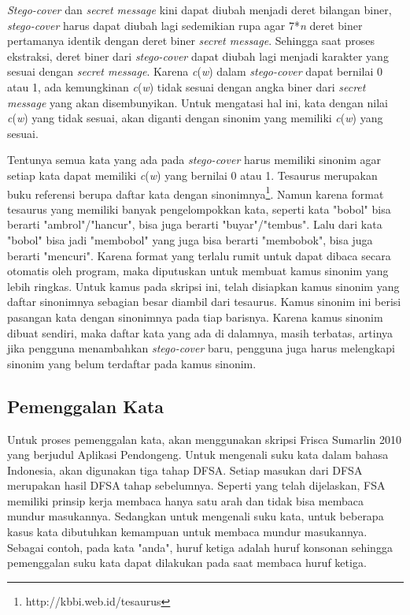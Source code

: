 \textit{Stego-cover} dan \textit{secret message} kini dapat diubah menjadi deret bilangan biner, \textit{stego-cover} harus dapat diubah lagi sedemikian rupa agar 7*\textit{n} deret biner pertamanya identik dengan deret biner \textit{secret message}. Sehingga saat proses ekstraksi, deret biner dari \textit{stego-cover} dapat diubah lagi menjadi karakter yang sesuai dengan \textit{secret message}. Karena \textit{c}(\textit{w}) dalam \textit{stego-cover} dapat bernilai 0 atau 1, ada kemungkinan \textit{c}(\textit{w}) tidak sesuai dengan angka biner dari \textit{secret message} yang akan disembunyikan. Untuk mengatasi hal ini, kata dengan nilai \textit{c}(\textit{w}) yang tidak sesuai, akan diganti dengan sinonim yang memiliki \textit{c}(\textit{w}) yang sesuai.

Tentunya semua kata yang ada pada \textit{stego-cover} harus memiliki sinonim agar setiap kata dapat memiliki \textit{c}(\textit{w}) yang bernilai 0 atau 1. Tesaurus merupakan buku referensi berupa daftar kata dengan sinonimnya\footnote{http://kbbi.web.id/tesaurus}. Namun karena format tesaurus yang memiliki banyak pengelompokkan kata, seperti kata "bobol" bisa berarti "ambrol"/"hancur", bisa juga berarti "buyar"/"tembus". Lalu dari kata "bobol" bisa jadi "membobol" yang juga bisa berarti "membobok", bisa juga berarti "mencuri". Karena format yang terlalu rumit untuk dapat dibaca secara otomatis oleh program, maka diputuskan untuk membuat kamus sinonim yang lebih ringkas. Untuk kamus pada skripsi ini, telah disiapkan kamus sinonim yang daftar sinonimnya sebagian besar diambil dari tesaurus. Kamus sinonim ini berisi pasangan kata dengan sinonimnya pada tiap barisnya. Karena kamus sinonim dibuat sendiri, maka daftar kata yang ada di dalamnya, masih terbatas, artinya jika pengguna menambahkan \textit{stego-cover} baru, pengguna juga harus melengkapi sinonim yang belum terdaftar pada kamus sinonim.

\subsection{Pemenggalan Kata}
Untuk proses pemenggalan kata, akan menggunakan skripsi Frisca Sumarlin 2010 yang berjudul Aplikasi Pendongeng. Untuk mengenali suku kata dalam bahasa Indonesia, akan digunakan tiga tahap DFSA. Setiap masukan dari DFSA merupakan hasil DFSA tahap sebelumnya. Seperti yang telah dijelaskan, FSA memiliki prinsip kerja membaca hanya satu arah dan tidak bisa membaca mundur masukannya. Sedangkan untuk mengenali suku kata, untuk beberapa kasus kata dibutuhkan kemampuan untuk membaca mundur masukannya. Sebagai contoh, pada kata "anda", huruf ketiga adalah huruf konsonan sehingga pemenggalan suku kata dapat dilakukan pada saat membaca huruf ketiga.

